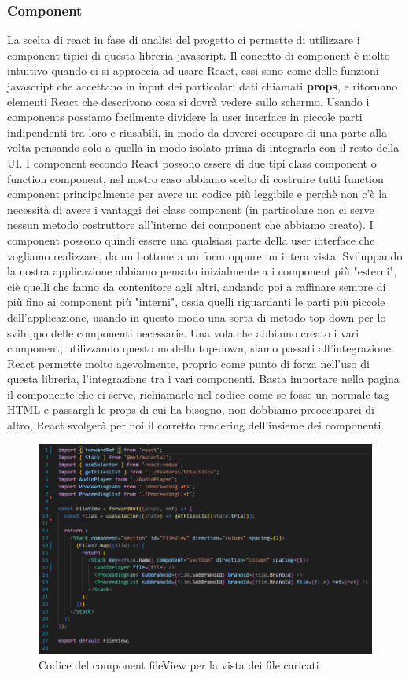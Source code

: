 \subsubsection{Component}
La scelta di react in fase di analisi del progetto ci permette di utilizzare i component tipici di questa libreria javascript. Il concetto di component è molto intuitivo quando ci si
approccia ad usare React, essi sono come delle funzioni javascript che accettano in input dei particolari dati chiamati \textbf{props}, e ritornano elementi React che
descrivono cosa si dovrà vedere sullo schermo. Usando i components possiamo facilmente dividere la user interface in piccole parti indipendenti tra loro e riusabili, in modo da
doverci occupare di una parte alla volta pensando solo a quella in modo isolato prima di integrarla con il resto della UI.
I component secondo React possono essere di due tipi class component o function component, nel nostro caso abbiamo scelto di costruire tutti function component principalmente
per avere un codice più leggibile e perchè non c'è la necessità di avere i vantaggi dei class component (in particolare non ci serve nessun metodo costruttore all'interno dei component
che abbiamo creato). I component possono quindi essere una qualsiasi parte della user interface che vogliamo realizzare, da un bottone a un form oppure un intera vista. Sviluppando la
nostra applicazione abbiamo pensato inizialmente a i component più "esterni", ciè quelli che fanno da contenitore agli altri, andando poi a raffinare sempre di più fino ai component
più "interni", ossia quelli riguardanti le parti più piccole dell'applicazione, usando in questo modo una sorta di metodo top-down per lo sviluppo delle componenti necessarie.
Una vola che abbiamo creato i vari component, utilizzando questo modello top-down, siamo passati all'integrazione. React permette molto agevolmente, proprio come punto di forza
nell'uso di questa libreria, l'integrazione tra i vari componenti. Basta importare nella pagina il componente che ci serve, richiamarlo nel codice come se fosse un normale tag
HTML e passargli le props di cui ha bisogno, non dobbiamo preoccuparci di altro, React svolgerà per noi il corretto rendering dell'insieme dei componenti.

\begin{figure}[H]
  \centering
  \includegraphics[width=\textwidth]{immagini/fileView-component.png}
  \caption{Codice del component fileView per la vista dei file caricati}
\end{figure}

